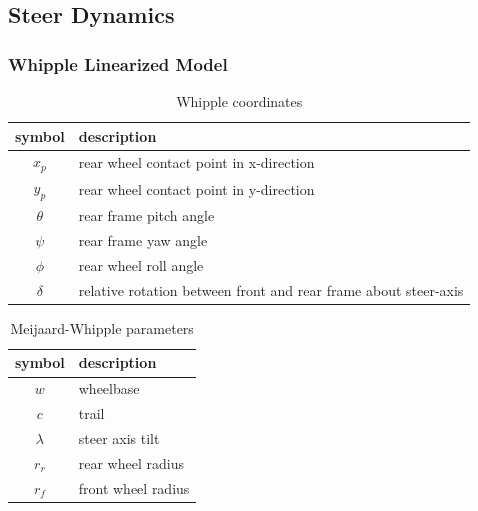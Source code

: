 \documentclass[11pt,a4paper,reqno]{amsart}
\newcommand{\x}{x_{p}}
\newcommand{\y}{y_{p}}
\newcommand{\pitch}{\theta}
\newcommand{\yaw}{\psi}
\newcommand{\roll}{\phi}
\newcommand{\steer}{\delta}
\begin{document}
\subsection{Steer Dynamics} \label{sec:steer_dynamics}
\subsubsection{Whipple Linearized Model}

\begin{table}
    \centering
    \begin{tabular}{|c|l|}
        \hline
        symbol & description \\
        \hline
        $ \x $ & rear wheel contact point in x-direction \\
        $ \y $ & rear wheel contact point in y-direction \\
        $ \pitch $ & rear frame pitch angle \\
        $ \yaw $ & rear frame yaw angle \\
        $ \roll $ & rear wheel roll angle \\
        $ \steer $ & relative rotation between front and rear frame about steer-axis\\
        \hline
    \end{tabular}
    \caption{Whipple coordinates}
    \label{tab:coordinates}
\end{table}

\begin{table}
    \centering
    \begin{tabular}{|c|l|}
        \hline
        symbol & description \\
        \hline
        $ w $ & wheelbase \\
        $ c $ & trail \\
        $ \lambda $ & steer axis tilt \\
        $ r_r $ & rear wheel radius \\
        $ r_f $ & front wheel radius \\
        \hline
    \end{tabular}
    \caption{Meijaard-Whipple parameters}
    \label{tab:parameters}
\end{table}
\end{document}
